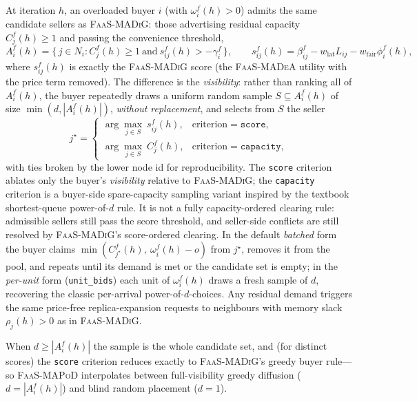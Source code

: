 At iteration $h$, an overloaded buyer $i$ (with $\omega_i^f(h)>0$) admits the
same candidate sellers as \textsc{FaaS-MADiG}: those advertising residual
capacity $C_j^f(h)\ge 1$ and passing the convenience threshold,
\begin{equation}
  A_i^f(h)=\{\,j\in N_i : C_j^f(h)\ge 1 \ \text{and}\ s_{ij}^f(h)>-\gamma_i^f\,\},
  \qquad
  s_{ij}^f(h)=\beta_{ij}^f-w_{\mathrm{lat}}L_{ij}-w_{\mathrm{fair}}\phi_i^f(h),
  \label{eq:mapod-score}
\end{equation}
where $s_{ij}^f(h)$ is exactly the \textsc{FaaS-MADiG} score (the
\textsc{FaaS-MADeA} utility with the price term removed). The difference is the
\emph{visibility}: rather than ranking all of $A_i^f(h)$, the buyer repeatedly
draws a uniform random sample $S\subseteq A_i^f(h)$ of size $\min(d,|A_i^f(h)|)$,
\emph{without replacement}, and selects from $S$ the seller
\begin{equation}
  j^\star=
  \begin{cases}
    \arg\max_{j\in S}\ s_{ij}^f(h), & \text{criterion}=\texttt{score},\\[2pt]
    \arg\max_{j\in S}\ C_j^f(h),     & \text{criterion}=\texttt{capacity},
  \end{cases}
  \label{eq:mapod-criterion}
\end{equation}
with ties broken by the lower node id for reproducibility. The \texttt{score}
criterion ablates only the buyer's \emph{visibility} relative to
\textsc{FaaS-MADiG}; the \texttt{capacity} criterion is a buyer-side
spare-capacity sampling variant inspired by the textbook shortest-queue
power-of-$d$ rule. It is not a fully capacity-ordered clearing rule: admissible
sellers still pass the score threshold, and seller-side conflicts are still
resolved by \textsc{FaaS-MADiG}'s score-ordered clearing. In the default
\emph{batched} form the buyer claims $\min(C_{j^\star}^f(h),\ \omega_i^f(h)-o)$
from $j^\star$, removes it from the pool, and repeats until its demand is met or
the candidate set is empty; in the \emph{per-unit} form (\texttt{unit\_bids})
each unit of $\omega_i^f(h)$ draws a fresh sample of $d$, recovering the classic
per-arrival power-of-$d$-choices. Any residual demand triggers the same
price-free replica-expansion requests to neighbours with memory slack
$\rho_j(h)>0$ as in \textsc{FaaS-MADiG}.

When $d\ge|A_i^f(h)|$ the sample is the whole candidate set, and (for
distinct scores) the \texttt{score} criterion reduces exactly to
\textsc{FaaS-MADiG}'s greedy buyer rule---so \textsc{FaaS-MAPoD} interpolates
between full-visibility greedy diffusion ($d=|A_i^f(h)|$) and blind random
placement ($d=1$).


